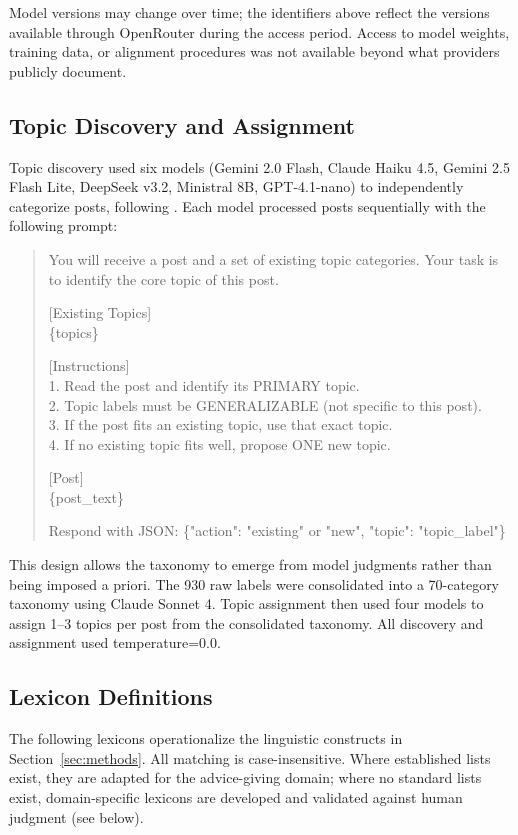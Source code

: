 Model versions may change over time; the identifiers above reflect the versions available through OpenRouter during the access period. Access to model weights, training data, or alignment procedures was not available beyond what providers publicly document.

\subsection{Topic Discovery and Assignment}

Topic discovery used six models (Gemini 2.0 Flash, Claude Haiku 4.5, Gemini 2.5 Flash Lite, DeepSeek v3.2, Ministral 8B, GPT-4.1-nano) to independently categorize posts, following \citet{pham2024topicgpt}. Each model processed posts sequentially with the following prompt:

\begin{quote}
\small
\ttfamily
You will receive a post and a set of existing topic categories. Your task is to identify the core topic of this post.

[Existing Topics]\\
\{topics\}

[Instructions]\\
1. Read the post and identify its PRIMARY topic.\\
2. Topic labels must be GENERALIZABLE (not specific to this post).\\
3. If the post fits an existing topic, use that exact topic.\\
4. If no existing topic fits well, propose ONE new topic.

[Post]\\
\{post\_text\}

Respond with JSON: \{"action": "existing" or "new", "topic": "topic\_label"\}
\end{quote}

This design allows the taxonomy to emerge from model judgments rather than being imposed a priori. The 930 raw labels were consolidated into a 70-category taxonomy using Claude Sonnet 4. Topic assignment then used four models to assign 1--3 topics per post from the consolidated taxonomy. All discovery and assignment used temperature=0.0.

\subsection{Lexicon Definitions}
\label{sec:lexicons}

The following lexicons operationalize the linguistic constructs in Section~\ref{sec:methods}. All matching is case-insensitive. Where established lists exist, they are adapted for the advice-giving domain; where no standard lists exist, domain-specific lexicons are developed and validated against human judgment (see below).

